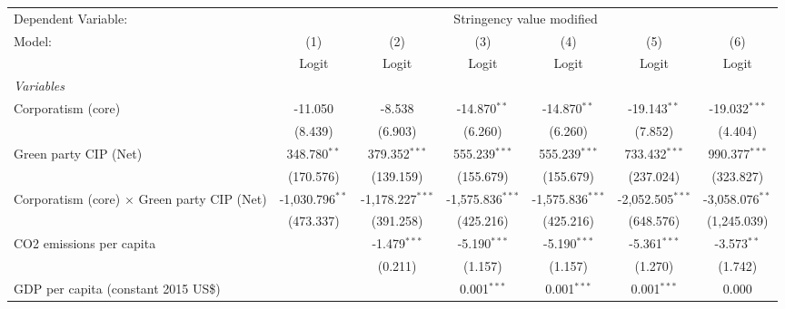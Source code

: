 
\begingroup
\centering
\begin{tabular}{lcccccc}
   \toprule
   Dependent Variable: & \multicolumn{6}{c}{Stringency value modified}\\
   Model:                                             & (1)               & (2)                & (3)                & (4)                & (5)                & (6)\\  
                                                      &  Logit            & Logit              & Logit              & Logit              & Logit              & Logit\\  
   \midrule
   \emph{Variables}\\
   Corporatism (core)                                 & -11.050           & -8.538             & -14.870$^{**}$     & -14.870$^{**}$     & -19.143$^{**}$     & -19.032$^{***}$\\   
                                                      & (8.439)           & (6.903)            & (6.260)            & (6.260)            & (7.852)            & (4.404)\\   
   Green party CIP (Net)                              & 348.780$^{**}$    & 379.352$^{***}$    & 555.239$^{***}$    & 555.239$^{***}$    & 733.432$^{***}$    & 990.377$^{***}$\\   
                                                      & (170.576)         & (139.159)          & (155.679)          & (155.679)          & (237.024)          & (323.827)\\   
   Corporatism (core) $\times$ Green party CIP (Net)  & -1,030.796$^{**}$ & -1,178.227$^{***}$ & -1,575.836$^{***}$ & -1,575.836$^{***}$ & -2,052.505$^{***}$ & -3,058.076$^{**}$\\   
                                                      & (473.337)         & (391.258)          & (425.216)          & (425.216)          & (648.576)          & (1,245.039)\\   
   CO2 emissions per capita                           &                   & -1.479$^{***}$     & -5.190$^{***}$     & -5.190$^{***}$     & -5.361$^{***}$     & -3.573$^{**}$\\   
                                                      &                   & (0.211)            & (1.157)            & (1.157)            & (1.270)            & (1.742)\\   
   GDP per capita (constant 2015 US\$)                &                   &                    & 0.001$^{***}$      & 0.001$^{***}$      & 0.001$^{***}$      & 0.000\\   

\end{tabular}
